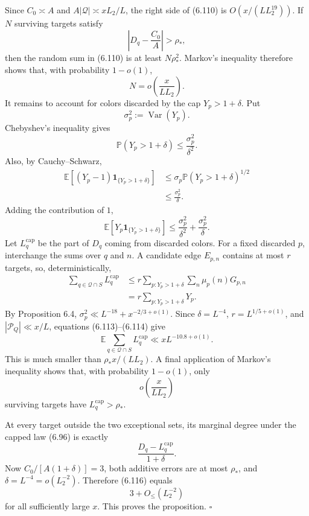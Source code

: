 \documentclass[10pt,letterpaper]{article}
\newcommand{\PP}{\mathbb{P}}
\newcommand{\EE}{\mathbb{E}}
\newcommand{\PQ}{\mathcal{P}_Q}
\newcommand{\QQ}{\mathcal{Q}}
\newcommand{\ind}{\mathbf{1}}
\newcommand{\qedmark}{\(\square\)}
\DeclareMathOperator{\Var}{Var}
\begin{document}
Since $C_0\asymp A$ and $A|\QQ|\asymp xL_2/L$, the right side of (6.110) is $O(x/(LL_2^{19}))$. If $N$ surviving targets satisfy
\[
\left|D_q-\frac{C_0}{A}\right|>\rho_*,
\]
then the random sum in (6.110) is at least $N\rho_*^2$. Markov's inequality therefore shows that, with probability
$1-o(1)$,
\begin{equation}
N=o\left(\frac{x}{LL_2}\right).
\tag{6.112}
\end{equation}
It remains to account for colors discarded by the cap $Y_p>1+\delta$. Put
\[
\sigma_p^2:=\Var(Y_p).
\]
Chebyshev's inequality gives
\[
\PP(Y_p>1+\delta)\le\frac{\sigma_p^2}{\delta^2}.
\]
Also, by Cauchy--Schwarz,
\[
\begin{aligned}
\EE[(Y_p-1)\ind_{\{Y_p>1+\delta\}}]
&\le\sigma_p\PP(Y_p>1+\delta)^{1/2}\\
&\le\frac{\sigma_p^2}{\delta}.
\end{aligned}
\]
Adding the contribution of $1$,
\begin{equation}
\EE[Y_p\ind_{\{Y_p>1+\delta\}}]
\le\frac{\sigma_p^2}{\delta^2}+\frac{\sigma_p^2}{\delta}.
\tag{6.113}
\end{equation}
Let $L_q^{\mathrm{cap}}$ be the part of $D_q$ coming from discarded colors. For a fixed discarded $p$, interchange the sums over
$q$ and $n$. A candidate edge $E_{p,n}$ contains at most $r$ targets, so, deterministically,
\begin{equation}
\begin{aligned}
\sum_{q\in\QQ\cap S}L_q^{\mathrm{cap}}
&\le r\sum_{p:Y_p>1+\delta}\sum_n\mu_p(n)G_{p,n}\\
&=r\sum_{p:Y_p>1+\delta}Y_p.
\end{aligned}
\tag{6.114}
\end{equation}
By Proposition 6.4, $\sigma_p^2\ll L^{-18}+x^{-2/3+o(1)}$. Since $\delta=L^{-4}$, $r=L^{1/5+o(1)}$, and $|\PQ|\ll x/L$, equations
(6.113)--(6.114) give
\begin{equation}
\EE\sum_{q\in\QQ\cap S}L_q^{\mathrm{cap}}\ll xL^{-10.8+o(1)}.
\tag{6.115}
\end{equation}
This is much smaller than $\rho_*x/(LL_2)$. A final application of Markov's inequality shows that, with probability
$1-o(1)$, only
\[
o\left(\frac{x}{LL_2}\right)
\]
surviving targets have $L_q^{\mathrm{cap}}>\rho_*$.

At every target outside the two exceptional sets, its marginal degree under the capped law (6.96) is exactly
\begin{equation}
\frac{D_q-L_q^{\mathrm{cap}}}{1+\delta}.
\tag{6.116}
\end{equation}
Now $C_0/[A(1+\delta)]=3$, both additive errors are at most $\rho_*$, and $\delta=L^{-4}=o(L_2^{-2})$. Therefore (6.116) equals
\[
3+O_{\le}(L_2^{-2})
\]
for all sufficiently large $x$. This proves the proposition. \qedmark
\end{document}

